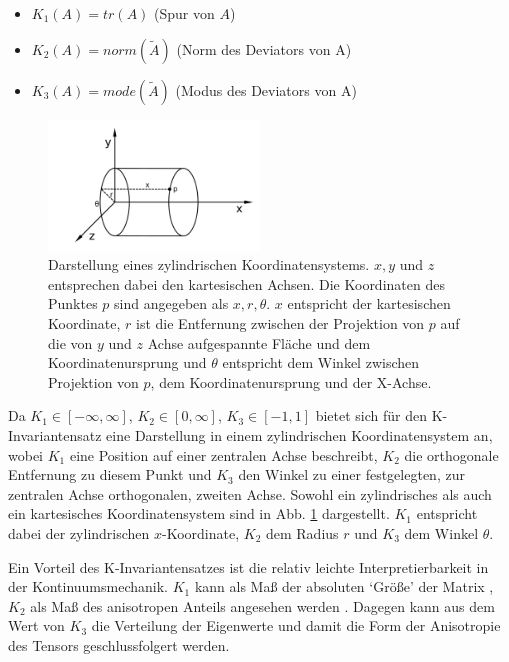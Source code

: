 \documentclass[a4paper,fontsize=12pt,toc=bib,halfparskip]{scrartcl}
\begin{document}
\begin{itemize}
	\item $K_1(A)=tr(A)$ (Spur von $A$)
	\item $K_2(A)=norm(\tilde{A})$ (Norm des Deviators von A)
	\item $K_3(A)=mode(\tilde{A})$ (Modus des Deviators von A)
\end{itemize}


\begin{figure}
	\centering
	\includegraphics[width=0.5\textwidth]{pictures/cylinder}
	\caption{Darstellung eines zylindrischen Koordinatensystems. $x,y$ und $z$ entsprechen dabei den kartesischen Achsen. Die Koordinaten des Punktes $p$ sind angegeben als $x, r, \theta$. $x$ entspricht der kartesischen Koordinate, $r$ ist die Entfernung zwischen der Projektion von $p$ auf die von $y$ und $z$ Achse aufgespannte Fl\"ache und dem Koordinatenursprung und $\theta$ entspricht dem Winkel zwischen Projektion von $p$, dem Koordinatenursprung und der X-Achse. }
	\label{cylinderCoords}
\end{figure}

Da $K_1 \in [-\infty, \infty]$, $K_2 \in [0,\infty]$, $K_3 \in [-1,1]$ bietet sich f\"ur den K-Invariantensatz eine Darstellung in einem zylindrischen Koordinatensystem an, wobei $K_1$ eine Position auf einer zentralen Achse beschreibt, $K_2$ die orthogonale Entfernung zu diesem Punkt und $K_3$ den Winkel zu einer festgelegten, zur zentralen Achse orthogonalen, zweiten Achse. Sowohl ein zylindrisches als auch ein kartesisches Koordinatensystem sind in Abb. \ref{cylinderCoords} dargestellt. $K_1$ entspricht dabei der zylindrischen $x$-Koordinate, $K_2$ dem Radius $r$ und $K_3$ dem Winkel $\theta$.

Ein Vorteil des K-Invariantensatzes ist die relativ leichte Interpretierbarkeit in der Kontinuumsmechanik. $K_1$ kann als Ma{\ss} der absoluten `Gr\"o{\ss}e' der Matrix , $K_2$ als Ma{\ss} des anisotropen Anteils angesehen werden \cite{kindlmann2007diffusion}. Dagegen kann aus dem Wert von $K_3$ die Verteilung der Eigenwerte und damit die Form der Anisotropie des Tensors geschlussfolgert werden.
\end{document}
